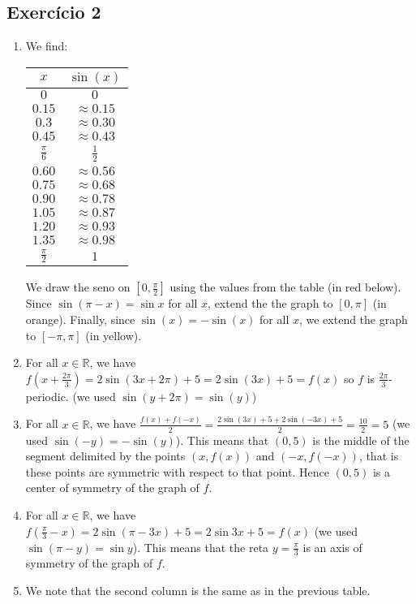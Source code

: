 \subsection*{Exercício 2}

\begin{enumerate}
\item We find:
    \begin{center}
    \begin{tabular}{| c | c | }
      \hline
      $x$ & $\sin{(x)}$ \\
      \hline
      $0$ & $0$ \\
      $0.15$ & $\approx 0.15$ \\
      $0.3$ & $\approx 0.30$ \\
      $0.45$ & $\approx 0.43$ \\
      $\frac{\pi}{6}$ & $\frac{1}{2}$ \\
      $0.60$ & $\approx 0.56$ \\
      $0.75$ & $\approx 0.68$ \\
      $0.90$ & $\approx 0.78$ \\
      $1.05$ & $\approx 0.87$ \\
      $1.20$ & $\approx 0.93$ \\
      $1.35$ & $\approx 0.98$ \\
      $\frac{\pi}{2}$ & $1$ \\
      \hline
    \end{tabular}
    \end{center}

  We draw the seno on $[0,\frac{\pi}{2}]$ using the values from
  the table (in red below). Since $\sin{\left(\pi-x\right)} = \sin{x}$ for all
  $x$, extend the the graph to $[0,\pi]$ (in orange). Finally, since
  $\sin{(x)} = -\sin{(x)}$ for all $x$,
  we extend the graph to $[-\pi,\pi]$ (in yellow).

  \item For all $x \in \mathbb R$, we have
    $f{\left(x+\frac{2\pi}{3}\right)} =
    2 \sin{\left(3x + 2\pi\right)} + 5 =
    2 \sin{(3x)} + 5 = f(x)$ so $f$ is $\frac{2\pi}{3}$-periodic.
    (we used $\sin{\left(y+2\pi\right)} = \sin{\left(y\right)}$)
  \item For all $x \in \mathbb R$, we have
    $\frac{f{(x)} + f{(-x)}}{2} =
    \frac{2 \sin{\left(3x\right)} + 5 +
      2 \sin{\left(-3x\right)} + 5}{2} = \frac{10}{2} = 5$
    (we used $\sin{\left(-y\right)} = -\sin{\left(y\right)}$).
    This means that $(0,5)$ is the middle of the segment delimited by the points
    $(x,f(x))$ and $(-x,f(-x))$, that is these points are symmetric with
    respect to that point. Hence $(0,5)$ is a center of symmetry of the graph
    of $f$.
  \item For all $x \in \mathbb R$, we have
    $f{\left(\frac{\pi}{3}-x\right)} =
    2 \sin{\left(\pi-3x\right)} + 5 = {2\sin{3x} +5} = f(x)
    $ (we used $\sin{(\pi-y)} = \sin{y}$).
    This means that the reta $y = \frac{\pi}{3}$ is an axis of symmetry of
    the graph of $f$.
  \item We note that the second column is the same as in the previous table.


\end{enumerate}
